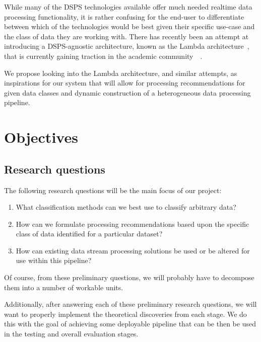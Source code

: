 \documentclass[a4paper,11pt]{article}
\begin{document}
While many of the DSPS technologies available offer much needed realtime data processing functionality, it is rather
confusing for the end-user to differentiate between which of the technologies would be best given their specific
use-case and the class of data they are working with. There has recently been an attempt at introducing a DSPS-agnostic
architecture, known as the Lambda architecture~\cite{marz2013principles}, that is currently gaining traction in the
academic community~\cite{islam_cloud_2014}~\cite{liu_survey_2014}.

We propose looking into the Lambda architecture, and similar attempts, as inspirations for our system that will allow
for processing recommendations for given data classes and dynamic construction of a heterogeneous data processing
pipeline.





\section{Objectives} %
\label{sec:objectives}

\subsection{Research questions} %
\label{sub:research_questions}

The following research questions will be the main focus of our project:

\begin{enumerate}
  \item What classification methods can we best use to classify arbitrary data?
  \item How can we formulate processing recommendations based upon the specific class of data identified for a particular dataset?
  \item How can existing data stream processing solutions be used or be altered for use within this pipeline?
\end{enumerate}

Of course, from these preliminary questions, we will probably have to decompose them into a number of workable units.

Additionally, after answering each of these preliminary research questions, we will want to properly implement the
theoretical discoveries from each stage. We do this with the goal of achieving some deployable pipeline that can be then
be used in the testing and overall evaluation stages.
\end{document}
